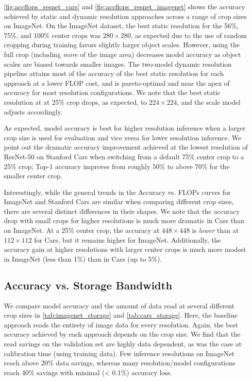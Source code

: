 \autoref{fig:accflops_resnet_cars} and \autoref{fig:accflops_resnet_imagenet} shows the accuracy achieved by static and dynamic resolution approaches across a range of crop sizes on ImageNet.
On the ImageNet dataset, the best static resolution for the 56\%, 75\%, and 100\% center crops was $280\times280$, as expected due to the use of random cropping during training favors slightly larger object scales.
However, using the full crop (including \emph{more} of the image area) decreases model accuracy as object scales are biased towards smaller images.
The two-model dynamic resolution pipeline attains most of the accuracy of the best static resolution for each approach at a lower FLOP cost, and is pareto-optimal and near the apex of accuracy for most resolution configurations.
We note that the best static resolution at at 25\% crop drops, as expected, to $224\times224$, and the scale model adjusts accordingly. 

As expected, model accuracy is best for higher resolution inference when a larger crop size is used for evaluation and vice versa for lower resolution inference.
We point out the dramatic accuracy improvement achieved at the lowest resolution of ResNet-50 on Stanford Cars when switching from a default 75\% center crop to a 25\% crop; Top-1 accuracy improves from roughly 50\% to above 70\% for the smaller center crop.

Interestingly, while the general trends in the Accuracy vs. FLOPs curves for ImageNet and Stanford Cars are similar when comparing different crop sizes, there are several distinct differences in their shapes.
We note that the accuracy drop with small crops for higher resolutions is much more dramatic in Cars than on ImageNet.
At a 25\% center crop, the accuracy at $448\times448$ is \emph{lower} than at $112\times112$ for Cars, but it remains higher for ImageNet. 
Additionally, the accuracy gain at higher resolutions with larger center crops is much more modest in ImageNet (less than 1\%) than in Cars (up to 5\%).


\subsection{Accuracy vs. Storage Bandwidth}
\label{sec:storage}
We compare model accuracy and the amount of data read at several different crop sizes in \autoref{tab:imagenet_storage} and \autoref{tab:cars_storage}.
Here, the baseline approach reads the entirety of image data for every resolution.
Again, the best accuracy achieved by each approach depends on the crop size.
We find that the read savings on the validation set are highly data dependent, as was the case at calibration time (using training data).
Few inference resolutions on ImageNet reach above 20\% data savings, whereas many resolution/model configurations reach 40\% savings with minimal (< 0.1\%) accuracy loss.

